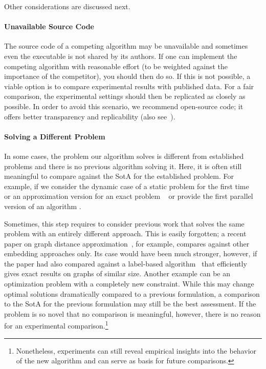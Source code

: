 \documentclass[algorithms,article,submit,moreauthors,pdftex]{Definitions/mdpi}
\newcommand{\changed}[1]{#1}
\begin{document}
Other considerations are discussed next.

\paragraph{Unavailable Source Code}
%
The source code of a competing algorithm may be unavailable and sometimes even the executable
is not shared by its authors.
If one can implement the competing algorithm with reasonable effort
(to be weighted against the importance of the competitor), you should \changed{then} do so.
If this is not possible, a viable option is to compare experimental results with published data.
For a fair comparison, the experimental settings should then be replicated as closely as possible.
In order to avoid this scenario, we recommend open-source code; it offers better transparency
and replicability (also see~).

\paragraph{Solving a Different Problem}
%
In some cases, the problem our algorithm solves is different from
established problems and there is no previous algorithm solving it.
Here, it is often still meaningful to compare against the SotA for the established problem.
For example, if we consider the dynamic case of a static problem for the first time
~\cite{bergamini15,green12,kourtellis14} or an approximation version for an exact problem
~\cite{brandes07,bader2007approximating, geisberger08}
or provide the first parallel version of an algorithm \cite{bader06}.
\changed{
Sometimes, this step requires to consider previous work that solves the same problem with an entirely different approach.
This is easily forgotten; a recent paper on graph distance
approximation~\cite{rizi2018shortest}, for example, compares against
other embedding approaches only. Its case would have been much stronger,
however, if the paper had also compared against a label-based
algorithm~\cite{akiba2013fast} that efficiently gives exact results on graphs of similar size.}
Another example can be an optimization problem with a completely new constraint.
While this may change optimal solutions dramatically compared to a previous formulation, a comparison to
the SotA for the previous formulation may still be the best assessment.
If the problem is so novel that no comparison is meaningful, however, there is no reason
for an experimental comparison.\footnote{Nonetheless, experiments can still reveal empirical insights into the behavior of the new algorithm \changed{and can serve as basis for future comparisons}.}
\end{document}
